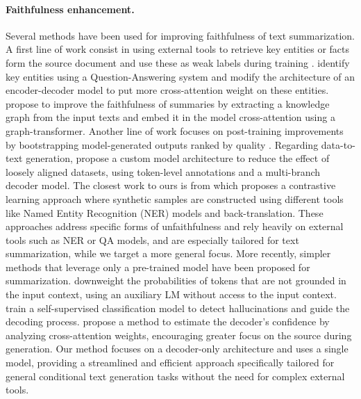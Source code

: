 \paragraph{Faithfulness enhancement.} Several methods have been used for improving faithfulness of text summarization. A first line of work consist in using external tools to retrieve key entities or facts form the source document and use these as weak labels during training \citep{zhang-etal-2022-improving-faithfulness}. \citet{faitful-improv} identify key entities using a Question-Answering system and modify the architecture of an encoder-decoder model to put more cross-attention weight on these entities. \citet{zhu-etal-2021-enhancing} propose to improve the faithfulness of summaries by extracting a knowledge graph from the input texts and embed it in the model cross-attention using a graph-transformer. Another line of work focuses on post-training improvements by bootstrapping model-generated outputs ranked by quality \citep{slic,brio,slic-nli}.
Regarding data-to-text generation, \citet{RebuffelRSSCG22} propose a custom model architecture to reduce the effect of loosely aligned datasets, using token-level annotations and a multi-branch decoder model. The closest work to ours is from \citep{cao-wang-2021-cliff} which proposes a contrastive learning approach where synthetic samples are constructed using different tools like Named Entity Recognition (NER) models and back-translation.
These approaches address specific forms of unfaithfulness and rely heavily on external tools such as NER or QA models, and are especially tailored for text summarization, while we target a more general focus. More recently, simpler methods that leverage only a pre-trained model have been proposed for summarization. \citet{cad,pmi} downweight the probabilities of tokens that are not grounded in the input context, using an auxiliary LM without access to the input context.
\citet{critic-driven} train a self-supervised classification model to detect hallucinations and guide the decoding process.  \cite{confident-decoding} propose a method to estimate the decoder's confidence by analyzing cross-attention weights, encouraging greater focus on the source during generation. Our method focuses on a decoder-only architecture and uses a single model, providing a streamlined and efficient approach specifically tailored for general conditional text generation tasks without the need for complex external tools.

